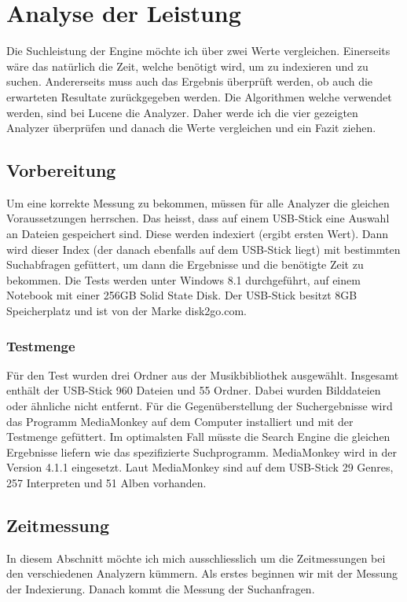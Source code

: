 \documentclass[12pt,a4paper,ngerman]{report}
\begin{document}
\section{Analyse der Leistung}
Die Suchleistung der Engine möchte ich über zwei Werte vergleichen. Einerseits wäre das natürlich die Zeit, welche benötigt wird, um zu indexieren und zu suchen. Andererseits muss auch das Ergebnis überprüft werden, ob auch die erwarteten Resultate zurückgegeben werden. Die Algorithmen welche verwendet werden, sind bei Lucene die Analyzer. Daher werde ich die vier gezeigten Analyzer überprüfen und danach die Werte vergleichen und ein Fazit ziehen.
\subsection{Vorbereitung}
Um eine korrekte Messung zu bekommen, müssen für alle Analyzer die gleichen Voraussetzungen herrschen. Das heisst, dass auf einem USB-Stick eine Auswahl an Dateien gespeichert sind. Diese werden indexiert (ergibt ersten Wert). Dann wird dieser Index (der danach ebenfalls auf dem USB-Stick liegt) mit bestimmten Suchabfragen gefüttert, um dann die Ergebnisse und die benötigte Zeit zu bekommen. Die Tests werden unter Windows 8.1 durchgeführt, auf einem Notebook mit einer 256GB Solid State Disk. Der USB-Stick besitzt 8GB Speicherplatz und ist von der Marke disk2go.com.\\
\subsubsection{Testmenge}
Für den Test wurden drei Ordner aus der Musikbibliothek ausgewählt. Insgesamt enthält der USB-Stick 960 Dateien und 55 Ordner. Dabei wurden Bilddateien oder ähnliche nicht entfernt. Für die Gegenüberstellung der Suchergebnisse wird das Programm MediaMonkey auf dem Computer installiert und mit der Testmenge gefüttert. Im optimalsten Fall müsste die Search Engine die gleichen Ergebnisse liefern wie das spezifizierte Suchprogramm. MediaMonkey wird in der Version 4.1.1 eingesetzt. Laut MediaMonkey sind auf dem USB-Stick 29 Genres, 257 Interpreten und 51 Alben vorhanden.
\subsection{Zeitmessung}
In diesem Abschnitt möchte ich mich ausschliesslich um die Zeitmessungen bei den verschiedenen Analyzern kümmern. Als erstes beginnen wir mit der Messung der Indexierung. Danach kommt die Messung der Suchanfragen.
\end{document}

